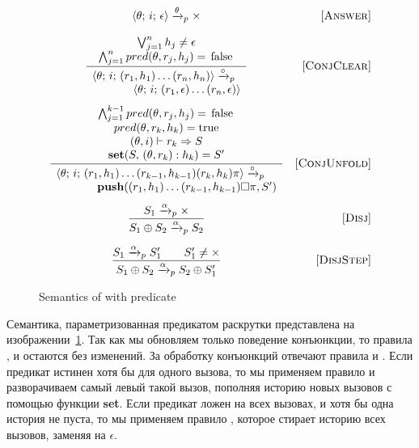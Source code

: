 \begin{figure}[h!]
\[\begin{array}{cr}
      {\inbr{\theta;\, i;\, \epsilon} \xrightarrow{\theta}_p \times}  
&     \ruleno{Answer} \\[4mm]
      \dfrac
      {\begin{array}{c}
           \bigvee_{j=1}^n h_j \not= \epsilon \\
           \bigwedge_{j=1}^n pred(\theta, r_j, h_j) = \mbox{\lstinline{false}}
      \end{array}}
      {\begin{array}{l}
      \inbr{\theta;\, i;\, (r_1,h_1) \ldots (r_n,h_n)} \xrightarrow{\circ}_p \\
      \phantom{XXXX} \inbr{\theta;\, i;\, (r_1,\epsilon) \ldots 
      (r_n, \epsilon)}
      \end{array}}
      &  \ruleno{ConjClear} \\[10mm]
      
      \dfrac
      {
        \begin{array}{c}
          \bigwedge_{j=1}^{k-1} pred(\theta, r_j, h_j) = \mbox{\lstinline{false}} \\
          pred(\theta, r_k, h_k) = \mbox{\lstinline{true}} \\
          (\theta, i) \vdash r_k \Rightarrow S \\
          \primi{set}(S, \, (\theta, r_k) : h_k) = S'
        \end{array}
      }
      {
        \begin{array}{l}
          \inbr{\theta;\, i;\, (r_1,h_1) \ldots (r_{k-1},h_{k-1}) (r_k, h_k) \pi} \xrightarrow{\circ}_p \\
          \phantom{XXXX}\primi{push}( (r_1,h_1) \ldots (r_{k-1},h_{k-1})\Box \pi, S')
         \end{array}
        }
&     \ruleno{ConjUnfold} \\[10mm]
\dfrac{S_1 \xrightarrow{\alpha}_p \times}
      {S_1 \oplus S_2 \xrightarrow{\alpha}_p S_2}
&     \ruleno{Disj} \\[6mm]
\dfrac{S_1 \xrightarrow{\alpha}_p S'_1 \qquad S'_1 \not= \times}
      {S_1 \oplus S_2 \xrightarrow{\alpha}_p S_2 \oplus S'_1}
&     \ruleno{DisjStep}
\end{array}\]
\caption{Semantics of \mk with predicate}
\label{fair:pred-fair-semantics}
\end{figure}

Семантика, параметризованная предикатом раскрутки представлена на изображении~\ref{fair:pred-fair-semantics}. Так как мы обновляем только поведение конъюнкции, то правила ,  и  остаются без изменений. За обработку конъюнкций отвечают правила  и . Если предикат истинен хотя бы для одного вызова, то мы применяем правило и разворачиваем самый левый такой вызов, пополняя историю новых вызовов с помощью функции {\bf set}. Если предикат ложен на всех вызовах, и хотя бы одна история не пуста, то мы применяем правило , которое стирает историю всех вызовов, заменяя на $\epsilon$.

